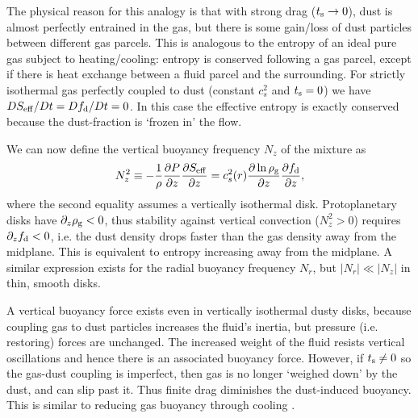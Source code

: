 The physical reason for this analogy is that with strong drag
($t_\mathrm{s}\to0$), dust is almost perfectly entrained in the gas, but
there is some gain/loss of dust particles between different  
gas parcels. This is analogous to the entropy of an ideal 
pure gas subject to heating/cooling: entropy is conserved following
a gas parcel, except if there is heat exchange between a fluid parcel and the
surrounding. For strictly isothermal gas perfectly coupled to dust
(constant $c_s^2$ and $t_\mathrm{s}=0$) we have 
$DS_\mathrm{eff}/ D t = Df_\mathrm{d}/D t=0$. In this case the effective 
entropy is exactly conserved because the dust-fraction is `frozen in' the
flow. 


We can now define the vertical buoyancy frequency $N_z$ of the mixture
as    
\begin{align}
  N_z^2 \equiv - \frac{1}{\rho}\frac{\partial P}{\partial z}\frac{\partial S_\mathrm{eff}}{\partial z}
  =c_s^2(r) \frac{\partial \ln{\rho_\mathrm{g}}}{\partial z}\frac{\partial f_\mathrm{d}}{\partial z},
\end{align}
where the second equality assumes a vertically isothermal disk. 
Protoplanetary disks have $\partial_z\rho_\mathrm{g}<0$, thus stability against vertical 
convection ($N_z^2>0$) requires $\partial_zf_\mathrm{d} <0 $, i.e. the dust density drops faster 
than the gas density away from the midplane. 
This is equivalent to 
entropy increasing away from the midplane. A similar expression exists
for the radial buoyancy frequency $N_r$, but $|N_r|\ll |N_z|$ in thin,
smooth disks. 

A vertical buoyancy force exists even in vertically isothermal
dusty disks, because coupling gas to dust particles increases
the fluid's inertia, but pressure (i.e. restoring) forces are
unchanged. The increased weight of the fluid resists vertical
oscillations and hence there is an associated buoyancy force. However,
if $t_\mathrm{s}\neq0$ so the gas-dust coupling is imperfect, then gas is no
longer `weighed down' by the dust, and can slip past it. Thus finite
drag diminishes the dust-induced buoyancy. This is similar to reducing
gas buoyancy through cooling \citep{lin15}. 

